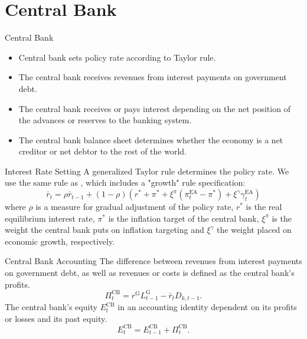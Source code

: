 \documentclass[9pt]{beamer}
\begin{document}
\section{Central Bank}
\begin{frame}{Central Bank}
\label{CentralBank}
    \begin{itemize}
        \item Central bank sets policy rate according to Taylor rule.
        \item The central bank receives revenues from interest payments on government debt.
        \item The central bank receives or pays interest depending on the net position of the advances or reserves to the banking system.
        \item The central bank balance sheet determines whether the economy is a net creditor or net debtor to the rest of the world.
    \end{itemize}
    \hyperlink{ReturnOverview}{}

\end{frame}
\begin{frame}{Interest Rate Setting}
    A generalized Taylor rule \citep{taylor_discretion_1993} determines the policy rate. We use the same rule as \cite{blattner_towards_2010}, which includes a "growth" rule specification: 
\begin{equation}
    \bar{r}_t=\rho \bar{r}_{t-1}+(1-\rho)\left(r^*+\pi^*+\xi^\pi\left(\pi^{\mathrm{EA}}_t-\pi^*\right)+\xi^\gamma \gamma^{\mathrm{EA}}_t\right)
\end{equation}
where $\rho$ is a measure for gradual adjustment of the policy rate, $r^*$ is the real equilibrium interest rate, $\pi^*$ is the inflation target of the central bank, $ \xi^\pi$ is the weight the central bank puts on inflation targeting and $\xi^\gamma$ the weight placed on economic growth, respectively. 
\hyperlink{ReturnOverview}{}

\end{frame}
\begin{frame}{Central Bank Accounting}
    The difference between revenues from interest payments on government debt, as well as revenues or costs  is defined as the central bank's profits.
\begin{equation}
    \Pi^{\mathrm{CB}}_t=r^{\mathrm{G}} L^{\mathrm{G}}_{t-1}-\bar{r}_t D_{k,t-1} .
\end{equation}
The central bank's equity $E^{\mathrm{CB}}_t$ in an accounting identity dependent on its profits or losses and its past equity. 
\begin{equation}
    E^{\mathrm{CB}}_t=E^{\mathrm{CB}}_{t-1}+\Pi^{\mathrm{CB}}_t .
\end{equation}
\hyperlink{ReturnOverview}{}

\end{frame}
\end{document}
